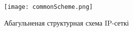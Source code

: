 
\vspace{-\baselineskip}
\begin{figure}[h!]
    \renewcommand{\thefigure}{A.1}
    \centering
    \texttt{[image: commonScheme.png]}
    \vspace{-\baselineskip}
    \caption{Абагульненая структурная схема IP-сеткі}
    \label{figure:Common Scheme}
\end{figure}
